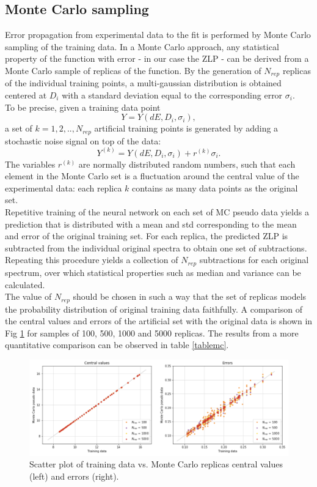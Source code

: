\documentclass[11pt,a4paper]{article}
\numberwithin{equation}{section}
\numberwithin{figure}{section}
\numberwithin{table}{section}
\begin{document}
\subsection{Monte Carlo sampling}
Error propagation from experimental data to the fit is performed by Monte Carlo sampling of the training data. In a Monte Carlo approach, any statistical property of the function with error - in our case the ZLP - can be derived from a Monte Carlo sample of replicas of the function. By the generation of $N_{rep}$ replicas of the individual training points, a multi-gaussian distribution is obtained centered at $D_i$ with a standard deviation equal to the corresponding error $\sigma_i$. \\
To be precise, given a training data point
\begin{equation}
    Y = Y(dE, D_i,\sigma_i), 
\end{equation} a set of $k= 1,2,..,N_{rep}$ artificial training points is generated by adding a stochastic noise signal on top of the data: 
\begin{equation}
    Y^{(k)} = Y(dE, D_i,\sigma_i) + r^{(k)}\sigma_i.
\end{equation}
The variables $r^{(k)}$ are normally distributed random numbers, such that each element in the Monte Carlo set is a fluctuation around the central value of the experimental data: each replica $k$ contains as many data points as the original set. \\
Repetitive training of the neural network on each set of MC pseudo data yields a prediction that is distributed with a mean and std corresponding to the mean and error of the original training set. For each replica, the predicted ZLP is subtracted from the individual original spectra to obtain one set of subtractions. Repeating this procedure yields a collection of $N_{rep}$ subtractions for each original spectrum, over which statistical properties such as median and variance can be calculated. \\

The value of $N_{rep}$ should be chosen in such a way that the set of replicas models the probability distribution of original training data faithfully. A comparison of the central values and errors of the artificial set with the original data is shown in Fig \ref{mc} for samples of 100, 500, 1000 and 5000 replicas. The results from a more quantitative comparison can be observed in table \ref{tablemc}.

\begin{figure}[H]
    \centering 
    \includegraphics[width=160mm]{plots/MC.png}
    \caption{Scatter plot of training data vs. Monte Carlo replicas central values (left) and errors (right). }
    \label{mc}
\end{figure}
\end{document}

